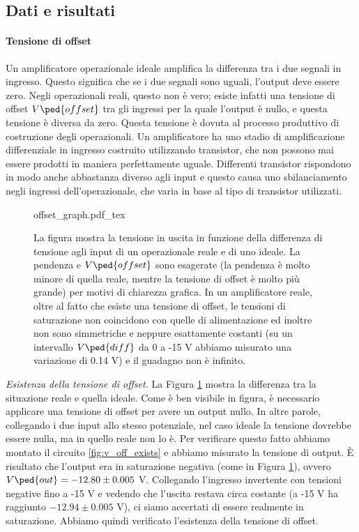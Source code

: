 \subsection{Dati e risultati}

\paragraph{Tensione di offset}

Un amplificatore operazionale ideale amplifica la differenza tra i due segnali
in ingresso. Questo significa che se i due segnali sono uguali, l'output deve essere zero.
Negli operazionali reali, questo non è vero; esiste infatti una tensione di offset
$V\ped{offset}$ tra gli ingressi per la quale l'output è nullo, e questa tensione è diversa da zero.
Questa tensione è dovuta al processo produttivo di costruzione degli operazionali.
Un amplificatore ha uno stadio di amplificazione differenziale in ingresso costruito utilizzando
transistor, che non possono mai essere prodotti in maniera perfettamente uguale. Differenti
transistor rispondono in modo anche abbastanza diverso agli input e questo causa uno sbilanciamento
negli ingressi dell'operazionale, che varia in base al tipo di transistor utilizzati.

\begin{figure}[H]
    \def\svgwidth{0.5\textwidth}
    {offset_graph.pdf_tex}
    \caption{La figura mostra la tensione in uscita in funzione della differenza di tensione agli input di 
        un operazionale reale e di uno ideale. La pendenza e $V\ped{offset}$ sono esagerate
        (la pendenza è molto minore di quella reale, mentre la tensione di offset è molto più grande) per
        motivi di chiarezza grafica. In un amplificatore reale, oltre
        al fatto che esiste una tensione di offset, le tensioni di saturazione non coincidono con quelle
        di alimentazione ed inoltre non sono simmetriche e neppure esattamente costanti (su un intervallo
        $V\ped{diff}$ da 0 a -15 V abbiamo misurato una variazione di 0.14 V) e il guadagno non è infinito. }
    \label{fig:v_offset_graph}
\end{figure}

\emph{Esistenza della tensione di offset.}
La Figura \ref{fig:v_offset_graph} mostra la differenza tra la situazione reale e quella
ideale. Come è ben visibile in figura, è necessario applicare una tensione di offset per
avere un output nullo. In altre parole, collegando i due input allo stesso potenziale,
nel caso ideale la tensione dovrebbe essere nulla, ma in quello reale non lo è.
Per verificare questo fatto abbiamo montato il circuito \ref{fig:v_off_exists} e abbiamo misurato
la tensione di output. È risultato che l'output era in saturazione negativa (come in Figura \ref{fig:v_offset_graph}),
ovvero $V\ped{out} = -12.80 \pm 0.005$ V. Collegando l'ingresso invertente con tensioni negative fino a -15 V
e vedendo che l'uscita restava circa costante (a -15 V ha raggiunto $-12.94 \pm 0.005$ V),
ci siamo accertati di essere realmente in saturazione. Abbiamo quindi verificato l'esistenza
della tensione di offset.

